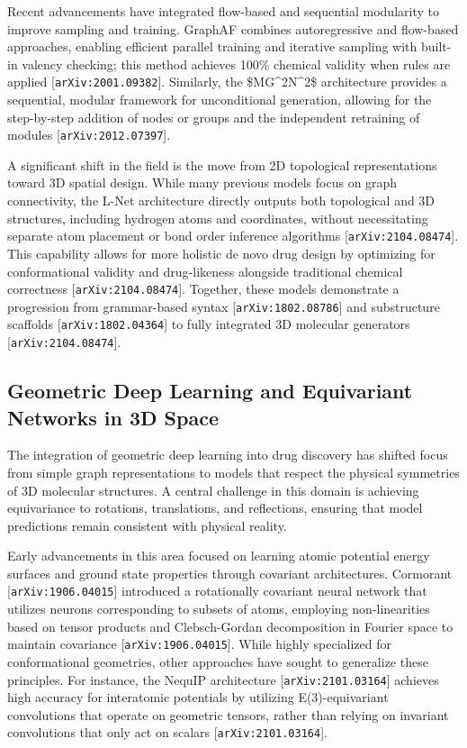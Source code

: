 \documentclass[11pt]{article}
\begin{document}
Recent advancements have integrated flow-based and sequential modularity to improve sampling and training. GraphAF combines autoregressive and flow-based approaches, enabling efficient parallel training and iterative sampling with built-in valency checking; this method achieves 100\% chemical validity when rules are applied [\texttt{arXiv:2001.09382}]. Similarly, the \$MG\textasciicircum{}2N\textasciicircum{}2\$ architecture provides a sequential, modular framework for unconditional generation, allowing for the step-by-step addition of nodes or groups and the independent retraining of modules [\texttt{arXiv:2012.07397}].

A significant shift in the field is the move from 2D topological representations toward 3D spatial design. While many previous models focus on graph connectivity, the L-Net architecture directly outputs both topological and 3D structures, including hydrogen atoms and coordinates, without necessitating separate atom placement or bond order inference algorithms [\texttt{arXiv:2104.08474}]. This capability allows for more holistic de novo drug design by optimizing for conformational validity and drug-likeness alongside traditional chemical correctness [\texttt{arXiv:2104.08474}]. Together, these models demonstrate a progression from grammar-based syntax [\texttt{arXiv:1802.08786}] and substructure scaffolds [\texttt{arXiv:1802.04364}] to fully integrated 3D molecular generators [\texttt{arXiv:2104.08474}].

\subsection{Geometric Deep Learning and Equivariant Networks in 3D Space}

The integration of geometric deep learning into drug discovery has shifted focus from simple graph representations to models that respect the physical symmetries of 3D molecular structures. A central challenge in this domain is achieving equivariance to rotations, translations, and reflections, ensuring that model predictions remain consistent with physical reality.

Early advancements in this area focused on learning atomic potential energy surfaces and ground state properties through covariant architectures. Cormorant [\texttt{arXiv:1906.04015}] introduced a rotationally covariant neural network that utilizes neurons corresponding to subsets of atoms, employing non-linearities based on tensor products and Clebsch-Gordan decomposition in Fourier space to maintain covariance [\texttt{arXiv:1906.04015}]. While highly specialized for conformational geometries, other approaches have sought to generalize these principles. For instance, the NequIP architecture [\texttt{arXiv:2101.03164}] achieves high accuracy for interatomic potentials by utilizing E(3)-equivariant convolutions that operate on geometric tensors, rather than relying on invariant convolutions that only act on scalars [\texttt{arXiv:2101.03164}].
\end{document}
